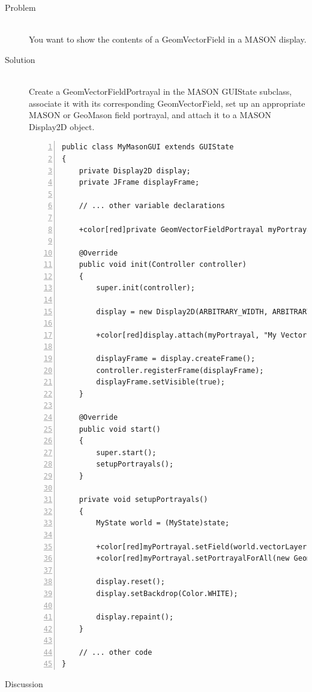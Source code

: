 \documentclass[twoside,10pt]{book}
\newcommand\code[1]{\textsf{#1}}
\begin{document}
\begin{description}
\item[Problem]~\\
You want to show the contents of a \code{GeomVectorField} in a
MASON display.

\item[Solution]~\\
Create a \code{GeomVectorFieldPortrayal} in the MASON \code{GUIState}
subclass, associate it with its corresponding \code{GeomVectorField},
set up an appropriate MASON or GeoMason field portrayal, and attach it
to a MASON \code{Display2D} object.

\begin{Verbatim}[frame=lines,framesep=5mm,numbers=left,commandchars=+\[\]]
public class MyMasonGUI extends GUIState
{
    private Display2D display;
    private JFrame displayFrame;

    // ... other variable declarations

    +color[red]private GeomVectorFieldPortrayal myPortrayal = new GeomVectorFieldPortrayal();

    @Override
    public void init(Controller controller)
    {
        super.init(controller);

        display = new Display2D(ARBITRARY_WIDTH, ARBITRARY_HEIGHT, this);

        +color[red]display.attach(myPortrayal, "My Vector Layer");

        displayFrame = display.createFrame();
        controller.registerFrame(displayFrame);
        displayFrame.setVisible(true);
    }

    @Override
    public void start()
    {
        super.start();
        setupPortrayals();
    }

    private void setupPortrayals()
    {
        MyState world = (MyState)state;

        +color[red]myPortrayal.setField(world.vectorLayer);
        +color[red]myPortrayal.setPortrayalForAll(new GeomPortrayal(Color.CYAN, true));+label[ex:trueforfill]

        display.reset();
        display.setBackdrop(Color.WHITE);

        display.repaint();
    }

    // ... other code
}
\end{Verbatim}

\item[Discussion ]~\\


\end{description}
\end{document}
